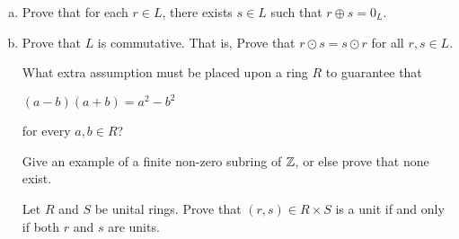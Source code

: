 \documentclass[11pt]{exam}
\begin{document}
\begin{questions}
\begin{enumerate}[(a)]
\item Prove that for each $r\in L$, there exists $s\in L$ such that $r \oplus s = 0_{L}$.
\vfill

\item Prove that $L$ is commutative.  That is, Prove that $r\odot s = s \odot r$ for all $r,s\in L$.
\vfill
\newpage


\question[5] What extra assumption must be placed upon a ring $R$ to guarantee that
\begin{center}
$(a-b)(a+b) = a^2 - b^2$
\end{center}
for every $a,b\in R$?
\vfill

\question[5] Give an example of a finite non-zero subring of $\mathbb{Z}$, or else prove that none exist.
\vfill

\newpage

\question[5] Let $R$ and $S$ be unital rings.  Prove that $(r,s)\in R\times S$ is a unit if and only if both $r$ and $s$ are units.
\end{enumerate}
\end{questions}
\end{document}
